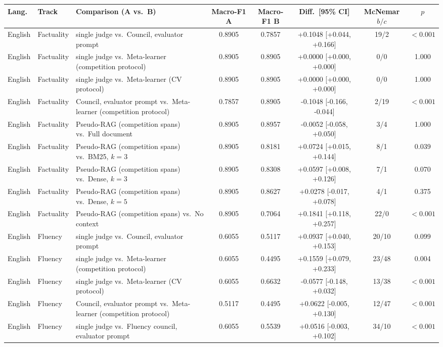\begin{tabular}{lllccccc}
\hline
\textbf{Lang.} & \textbf{Track} & \textbf{Comparison (A vs.~B)} & \textbf{Macro-F1 A} & \textbf{Macro-F1 B} & \textbf{Diff.~[95\% CI]} & \textbf{McNemar} $b/c$ & $p$ \\
\hline
English & Factuality & single judge vs.\ Council, evaluator prompt & 0.8905 & 0.7857 & +0.1048 [+0.044, +0.166] & 19/2 & $<0.001$ \\
English & Factuality & single judge vs.\ Meta-learner (competition protocol) & 0.8905 & 0.8905 & +0.0000 [+0.000, +0.000] & 0/0 & 1.000 \\
English & Factuality & single judge vs.\ Meta-learner (CV protocol) & 0.8905 & 0.8905 & +0.0000 [+0.000, +0.000] & 0/0 & 1.000 \\
English & Factuality & Council, evaluator prompt vs.\ Meta-learner (competition protocol) & 0.7857 & 0.8905 & -0.1048 [-0.166, -0.044] & 2/19 & $<0.001$ \\
English & Factuality & Pseudo-RAG (competition spans) vs.\ Full document & 0.8905 & 0.8957 & -0.0052 [-0.058, +0.050] & 3/4 & 1.000 \\
English & Factuality & Pseudo-RAG (competition spans) vs.\ BM25, $k=3$ & 0.8905 & 0.8181 & +0.0724 [+0.015, +0.144] & 8/1 & 0.039 \\
English & Factuality & Pseudo-RAG (competition spans) vs.\ Dense, $k=3$ & 0.8905 & 0.8308 & +0.0597 [+0.008, +0.126] & 7/1 & 0.070 \\
English & Factuality & Pseudo-RAG (competition spans) vs.\ Dense, $k=5$ & 0.8905 & 0.8627 & +0.0278 [-0.017, +0.078] & 4/1 & 0.375 \\
English & Factuality & Pseudo-RAG (competition spans) vs.\ No context & 0.8905 & 0.7064 & +0.1841 [+0.118, +0.257] & 22/0 & $<0.001$ \\
\hline
English & Fluency & single judge vs.\ Council, evaluator prompt & 0.6055 & 0.5117 & +0.0937 [+0.040, +0.153] & 20/10 & 0.099 \\
English & Fluency & single judge vs.\ Meta-learner (competition protocol) & 0.6055 & 0.4495 & +0.1559 [+0.079, +0.233] & 23/48 & 0.004 \\
English & Fluency & single judge vs.\ Meta-learner (CV protocol) & 0.6055 & 0.6632 & -0.0577 [-0.148, +0.032] & 13/38 & $<0.001$ \\
English & Fluency & Council, evaluator prompt vs.\ Meta-learner (competition protocol) & 0.5117 & 0.4495 & +0.0622 [-0.005, +0.130] & 12/47 & $<0.001$ \\
English & Fluency & single judge vs.\ Fluency council, evaluator prompt & 0.6055 & 0.5539 & +0.0516 [-0.003, +0.102] & 34/10 & $<0.001$ \\

\end{tabular}
